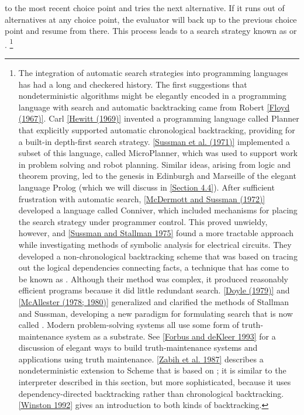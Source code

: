  to the most recent choice point and tries the next alternative.
If it runs out of alternatives at any choice point, the evaluator will back up to the previous choice point and resume from there.
This process leads to a search strategy known as  or .%
\footnote{
	The integration of automatic search strategies into programming languages has had a long and checkered history.
	The first suggestions that nondeterministic algorithms might be elegantly encoded in a programming language with search and automatic backtracking came from Robert \cref{Floyd (1967)}.
	Carl \cref{Hewitt (1969)} invented a programming language called Planner that explicitly supported automatic chronological backtracking, providing for a built-in depth-first search strategy.
	\cref{Sussman et al.
	(1971)} implemented a subset of this language, called MicroPlanner, which was used to support work in problem solving and robot planning.
	Similar ideas, arising from logic and theorem proving, led to the genesis in Edinburgh and Marseille of the elegant language Prolog (which we will discuss in \cref{Section 4.4}).
	After sufficient frustration with automatic search, \cref{McDermott and Sussman (1972)} developed a language called Conniver, which included mechanisms for placing the search strategy under programmer control.
	This proved unwieldy, however, and \cref{Sussman and Stallman 1975} found a more tractable approach while investigating methods of symbolic analysis for electrical circuits.
	They developed a non-chronological backtracking scheme that was based on tracing out the logical dependencies connecting facts, a technique that has come to be known as .
	Although their method was complex, it produced reasonably efficient programs because it did little redundant search.
	\cref{Doyle (1979)} and \cref{McAllester (1978; 1980)} generalized and clarified the methods of Stallman and Sussman, developing a new paradigm for formulating search that is now called .
	Modern problem-solving systems all use some form of truth-maintenance system as a substrate.
	See \cref{Forbus and deKleer 1993} for a discussion of elegant ways to build truth-maintenance systems and applications using truth maintenance.
	\cref{Zabih et al. 1987} describes a nondeterministic extension to Scheme that is based on ;
	it is similar to the interpreter described in this section, but more sophisticated, because it uses dependency-directed backtracking rather than chronological backtracking.
	\cref{Winston 1992} gives an introduction to both kinds of backtracking.
}



